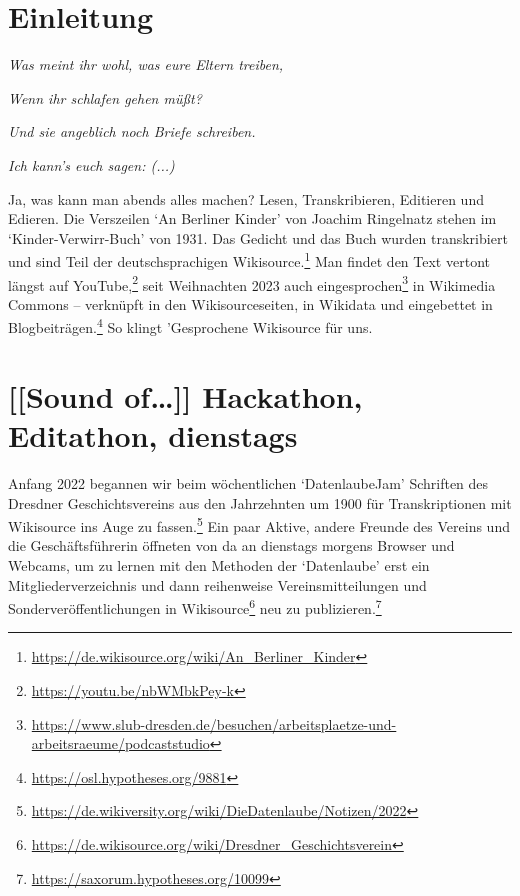 \documentclass[a4paper,
fontsize=11pt,
oneside,
numbers=noperiodatend,
parskip=half-,
bibliography=totoc,
final
]{scrartcl}
\begin{document}

\newpage
\hypertarget{einleitung}{%
\section{Einleitung}\label{einleitung}}

\begin{center}
\emph{Was meint ihr wohl, was eure Eltern treiben,}

\emph{Wenn ihr schlafen gehen müßt?}

\emph{Und sie angeblich noch Briefe schreiben.}

\emph{Ich kann's euch sagen: (...)}
\end{center}

Ja, was kann man abends alles machen? Lesen, Transkribieren, Editieren
und Edieren. Die Verszeilen \enquote*{An Berliner Kinder} von Joachim
Ringelnatz stehen im \enquote*{Kinder-Verwirr-Buch} von 1931. Das
Gedicht und das Buch wurden transkribiert und sind Teil der
deutschsprachigen Wikisource.\footnote{\url{https://de.wikisource.org/wiki/An_Berliner_Kinder}}
Man findet den Text vertont längst auf YouTube,\footnote{\url{https://youtu.be/nbWMbkPey-k}}
seit Weihnachten 2023 auch eingesprochen\footnote{\url{https://www.slub-dresden.de/besuchen/arbeitsplaetze-und-arbeitsraeume/podcaststudio}}
in Wikimedia Commons -- verknüpft in den Wikisourceseiten, in Wikidata
und eingebettet in Blogbeiträgen.\footnote{\url{https://osl.hypotheses.org/9881}}
So klingt 'Gesprochene Wikisource\textquotesingle{} für uns.

\hypertarget{sound-of-hackathon-editathon-dienstags}{%
\section{{[}{[}Sound of\ldots{]}{]} Hackathon, Editathon,
dienstags}\label{sound-of-hackathon-editathon-dienstags}}

Anfang 2022 begannen wir beim wöchentlichen \enquote*{DatenlaubeJam}
Schriften des Dresdner Geschichtsvereins aus den Jahrzehnten um 1900 für
Transkriptionen mit Wikisource ins Auge zu fassen.\footnote{\url{https://de.wikiversity.org/wiki/DieDatenlaube/Notizen/2022}}
Ein paar Aktive, andere Freunde des Vereins und die Geschäftsführerin
öffneten von da an dienstags morgens Browser und Webcams, um zu lernen
mit den Methoden der \enquote*{Datenlaube} erst ein
Mitgliederverzeichnis und dann reihenweise Vereinsmitteilungen und
Sonderveröffentlichungen in Wikisource\footnote{\url{https://de.wikisource.org/wiki/Dresdner_Geschichtsverein}}
neu zu publizieren.\footnote{\url{https://saxorum.hypotheses.org/10099}}
\end{document}
